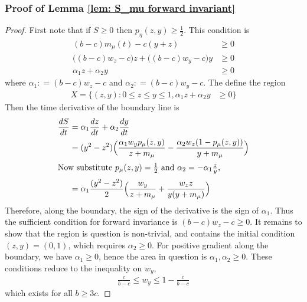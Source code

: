 \documentclass[10pt]{article}
\begin{document}
\subsubsection*{Proof of Lemma \ref{lem: S_mu forward invariant}}
\begin{proof}
First note that if $ S \geq 0$ then $p_\eta(z,y) \geq \frac{1}{2}$. This condition is 
\begin{align*}
    (b-c)m_\mu(t) - c(y+z) &\geq0\\
    \Big((b-c)w_z-c\Big)z + \Big((b-c)w_y-c\Big)y &\geq 0\\
    \alpha_1 z + \alpha_2y &\geq 0
\end{align*}
where $\alpha_1: = (b-c)w_z-c$ and $\alpha_2: = (b-c)w_y-c$. The define the region 
\begin{align*}
    X = \{(z,y) : 0 \leq z \leq y \leq 1, \alpha_1 z + \alpha_2y &\geq 0 \}
\end{align*}
Then the time derivative of the boundary line is
\begin{align*}
    \frac{dS}{dt} &= \alpha_1 \frac{dz}{dt}+\alpha_2\frac{dy}{dt}\\
    &= (y^2-z^2)\Big(\frac{\alpha_1w_y p_\mu(z,y)}{z+m_\mu} - \frac{\alpha_2w_z (1-p_\mu(z,y))}{y+m_\mu}\Big)\\
    \intertext{Now substitute $p_\mu(z,y) = \frac{1}{2}$ and $\alpha_2 = -\alpha_1\frac{z}{y}$,}
    &=\alpha_1\frac{(y^2-z^2)}{2}\Big(\frac{w_y}{z+m_\mu} + \frac{w_zz}{y(y+m_\mu)}\Big)
\end{align*}
Therefore, along the boundary, the sign of the derivative is the sign of $\alpha_1$. Thus the sufficient condition for forward invariance is $(b-c)w_z-c\geq0$. It remains to show that the region is question is non-trivial, and contains the initial condition $(z,y) = (0,1)$, which requires $\alpha_2 \geq 0$. For positive gradient along the boundary, we have $\alpha_1 \ge 0$, hence the area in question is $\alpha_1,\alpha_2 \ge 0$. These conditions reduce to the inequality on $w_y$,
\begin{align*}
    \frac{c}{b-c} \leq w_y \leq 1- \frac{c}{b-c}
\end{align*}
which exists for all $b\geq3c$. 
\end{proof}
\end{document}
